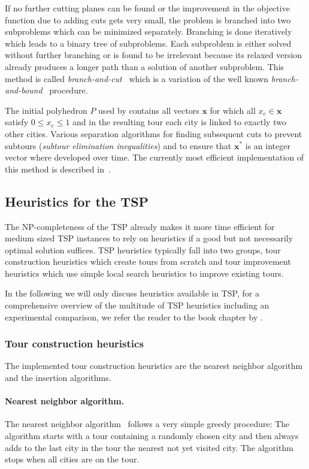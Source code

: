 \documentclass[10pt,a4paper,fleqn]{article}
\newcommand{\strong}[1]{{\normalfont\fontseries{b}\selectfont #1}}
\newcommand{\pkg}[1]{\strong{#1}}
\begin{document}
If no further cutting planes can be found or the improvement in the objective
function due to adding cuts gets very small, the problem is branched into two
subproblems which can be minimized separately. Branching is done iteratively
which leads to a binary tree of subproblems. Each subproblem is either solved
without further branching or is found to be irrelevant because its relaxed
version already produces a longer path than a solution of another subproblem.
This method is called \emph{branch-and-cut}~\citep{Padberg1990} which is a
variation of the well known \emph{branch-and-bound}~\citep{Land1960} procedure.

The initial polyhedron $P$ used by \cite{Dantzig1954} contains all vectors
$\mathbf{x}$ for which all $x_e \in \mathbf{x}$ satisfy $0 \le x_e \le 1$ and
in the resulting tour each city is linked to exactly two other cities.
Various separation algorithms for finding subsequent cuts to prevent subtours
(\emph{subtour elimination inequalities}) and to ensure that $\mathbf{x}^*$ is
an integer vector \citep[\emph{Gomory cuts;}][]{Gomory1963} where developed over
time. The currently most efficient implementation of this method is described
in~\cite{Applegate2000}. 

\subsection{Heuristics for the TSP}\label{sec:heuristics}

The NP-completeness of the TSP already makes it more time efficient for
medium sized TSP instances to rely on heuristics if a good but not
necessarily optimal solution suffices.  TSP heuristics typically fall
into two groups, tour construction heuristics which create tours from
scratch and tour improvement heuristics which use simple local search
heuristics to improve existing tours.

In the following we will only discuss heuristics available in \pkg{TSP}, for a
comprehensive overview of the multitude of TSP heuristics including an
experimental comparison, we refer the reader to the book chapter by
\cite{Johnson2002}.

\subsubsection{Tour construction heuristics}
The implemented tour construction heuristics are the nearest neighbor algorithm
and the insertion algorithms.

\paragraph{Nearest neighbor algorithm.}
The nearest neighbor algorithm~\citep{Rosenkrantz1977} 
follows a very simple greedy procedure:
The algorithm starts with a tour containing a randomly chosen city and then
always adds to the last city in the tour the nearest not yet visited
city. The algorithm stops when all cities are on the tour.  
\end{document}
